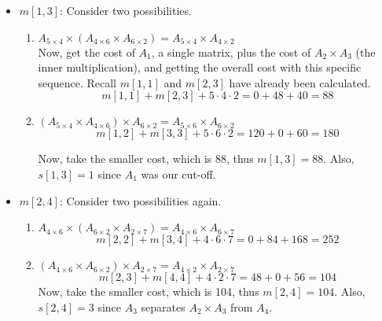 \documentclass{article}
\begin{document}
\begin{itemize}
    \item $m[1, 3]$: Consider two possibilities.
    \begin{enumerate}
        \item $A_{5 \times 4} \times ( A_{4 \times 6} \times A_{6 \times 2} ) = A_{5 \times 4} \times A_{4 \times 2}$\\
        Now, get the cost of $A_1$, a single matrix, plus the cost of $A_2 \times A_3$ (the inner multiplication), and getting the overall cost with this specific sequence. Recall $m[1, 1]$ and $m[2, 3]$ have already been calculated.
        \begin{equation*}
            m[1, 1] + m[2, 3] + 5\cdot4\cdot2 = 0 + 48 + 40 = 88
        \end{equation*}
        \item $( A_{5 \times 4} \times A_{4 \times 6} ) \times A_{6 \times 2} = A_{5 \times 6} \times A_{6 \times 2}$
        \begin{equation*}
            m[1, 2] + m[3, 3] + 5\cdot6\cdot2 = 120 + 0 + 60 = 180
        \end{equation*}
        
        Now, take the smaller cost, which is 88, thus $m[1, 3]=88$. Also, $s[1, 3]=1$ since $A_1$ was our cut-off.
    \end{enumerate}
    
    \item $m[2, 4]$: Consider two possibilities again.
    \begin{enumerate}
        \item $A_{4 \times 6} \times ( A_{6 \times 2} \times A_{2 \times 7} ) = A_{4 \times 6} \times A_{6 \times 7}$
        \begin{equation*}
            m[2, 2] + m[3, 4] + 4\cdot6\cdot7 = 0 + 84 + 168 = 252
        \end{equation*}
        \item $( A_{4 \times 6} \times A_{6 \times 2} ) \times A_{2 \times 7} = A_{4 \times 2} \times A_{2 \times 7}$
        \begin{equation*}
            m[2, 3] + m[4, 4] + 4\cdot2\cdot7 = 48 + 0 + 56 = 104
        \end{equation*}
        Now, take the smaller cost, which is 104, thus $m[2, 4]=104$. Also, $s[2, 4]=3$ since $A_3$ separates $A_2 \times A_3$ from $A_4$.
    \end{enumerate}
\end{itemize}
\end{document}
